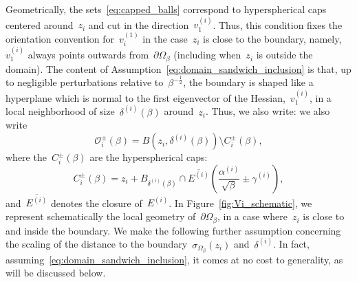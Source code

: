 \documentclass[10pt]{article}
\newcommand{\1}{\mathbbm 1}
\newcommand{\deltaRadius}[1]{\delta^{(#1)}} %
\newcommand{\epsLimit}[1]{\alpha^{(#1)}} %
\newcommand{\localNeighborhood}[2][]{\mathcal{O}_{#2}^{#1}} %
\newcommand{\localCap}[2][]{C_{#2}^{#1}}
\newcommand{\gammaPerturbation}[1]{\gamma^{(#1)}}
\newcommand{\hessEigvec}[2]{v^{(#1)}_{#2}} %
\newcommand{\halfSpace}[1]{E^{(#1)}}
\begin{document}
    Geometrically, the sets~\eqref{eq:capped_balls} correspond to hyperspherical caps centered around~$z_i$ and cut in the direction~$\hessEigvec{i}{1}$. Thus, this condition fixes the orientation convention for~$\hessEigvec{1}{i}$ in the case~$z_i$ is close to the boundary, namely,~$\hessEigvec{i}{1}$ always points outwards from~$\partial\Omega_\beta$ (including when~$z_i$ is outside the domain).
    The content of Assumption~\eqref{eq:domain_sandwich_inclusion} is that, up to negligible perturbations relative to~$\beta^{-\frac12}$, the boundary is shaped like a hyperplane which is normal to the first eigenvector of the Hessian,~$\hessEigvec{i}{1}$, in a local neighborhood of size~$\deltaRadius{i}(\beta)$ around~$z_i$.
    Thus, we also write:
    we also write
    \begin{equation}
        \localNeighborhood[\pm]{i}(\beta) = B(z_i,\deltaRadius{i}(\beta)) \setminus \localCap[\pm]{i}(\beta),
    \end{equation}
    where the~$\localCap[\pm]{i}(\beta)$ are the hyperspherical caps:
    \begin{equation}
        \label{eq:def_ball_cap}
        \localCap[\pm]{i}(\beta) = z_i + B_{\deltaRadius{i}(\beta)}\cap \overline{\halfSpace{i}}\left(\frac{\epsLimit{i}}{\sqrt\beta}\pm\gammaPerturbation{i}\right),
    \end{equation}
    and~$\overline{\halfSpace{i}}$ denotes the closure of~$\halfSpace{i}$.
    In Figure~\ref{fig:Vi_schematic}, we represent schematically the local geometry of~$\partial\Omega_\beta$, in a case where~$z_i$ is close to and inside the boundary.
    We make the following further assumption concerning the scaling of the distance to the boundary~$\sigma_{\Omega_\beta}(z_i)$ and~$\deltaRadius{i}$. In fact, assuming~\eqref{eq:domain_sandwich_inclusion}, it comes at no cost to generality, as will be discussed below.
\end{document}
